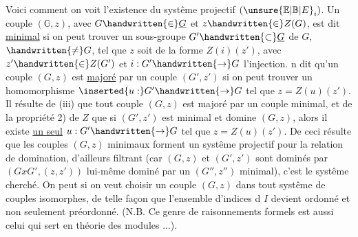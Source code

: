 

Voici comment on voit l'existence du systême projectif $(\unsure{\mathbb{E}|\mathbb{B}|E}_i)$. Un couple $(\mathbb{G},z)$, avec $G\handwritten{\in}\underline{G}$ et $z\handwritten{\in}Z(G)$, est dit \uline{minimal} si on  peut trouver un sous-groupe $G'\handwritten{\subset}\underline{G}$ de $G$,  $\handwritten{\ne}G$, tel que $z$ soit  de la forme $Z(i)(z')$, avec $z'\handwritten{\in}Z(G')$ et $i:G'\handwritten{\to}G$ l'injection.  n dit qu'un couple $(G,z)$ est \uline{majoré} par un couple $(G',z')$ si on peut trouver un homomorphisme $\inserted{u:}G'\handwritten{\to}G$ tel que $z=Z(u)(z')$. Il résulte de (iii) que tout couple $(G,z)$ est majoré par un couple minimal, et de la propriété 2) de $Z$ que si $(G',z')$ est minimal et domine $(G,z)$, alors il existe \uline{un seul} $u:G'\handwritten{\to}G$ tel que $z=Z(u)(z')$. De ceci résulte que les couples $(G,z)$ minimaux forment un systême projectif pour la relation de domination, d'ailleurs filtrant (car $(G,z)$ et $(G',z')$ sont dominés par $(GxG',(z,z'))$ lui-même dominé par un $(G'',z'')$ minimal), c'est le systême cherché. On peut si on veut choisir un couple $(G,z)$ dans tout systême de couples  isomorphes, de  telle façon que l'ensemble d'indices d $I$ devient ordonné et non seulement préordonné. (N.B. Ce genre de raisonnements formels est aussi celui qui sert en théorie des  modules ...).

